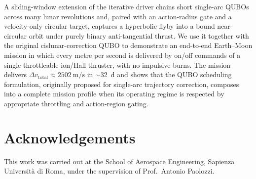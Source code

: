 \documentclass[11pt,a4paper]{article}
\theoremstyle{plain}
\begin{document}
A sliding-window extension of the iterative driver chains short
single-arc QUBOs across many lunar revolutions and, paired with
an action-radius gate and a velocity-only circular target,
captures a hyperbolic flyby into a bound near-circular orbit
under purely binary anti-tangential thrust. We use it together
with the original cislunar-correction QUBO to demonstrate an
end-to-end Earth--Moon mission in which every metre per second
is delivered by on/off commands of a single throttleable
ion/Hall thruster, with no impulsive burns. The mission
delivers $\Delta v_\mathrm{total} \approx
\SI{2502}{\meter\per\second}$ in $\sim$\SI{32}{\day} and shows
that the QUBO scheduling formulation, originally proposed for
single-arc trajectory correction, composes into a complete
mission profile when its operating regime is respected by
appropriate throttling and action-region gating.

\section*{Acknowledgements}
This work was carried out at the School of Aerospace Engineering,
Sapienza Universit\`a di Roma, under the supervision of Prof.\
Antonio Paolozzi.
\end{document}

